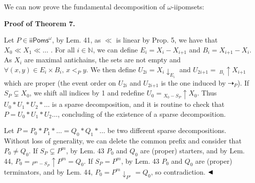  
 
We can now prove the fundamental decomposition of $\omega$-iipomsets:\par
 
 
 
 
\par\medskip\noindent\textbf{Proof of Theorem 7.}\par
 
 
Let $P\in{\mathsf{iiPoms}^{\omega}}$, by Lem. 41, as $\ll$ is linear by Prop. 5, we have that $X_{0}\ll X_{1}\ll\dots$ . For all $i\in\mathbb{N}$, we can define $E_{i}=X_{i}-X_{i\text{+}1}$ and $B_{i}=X_{i\text{+}1}-X_{i}$. As $X_{i}$ are maximal antichains, the sets are not empty and $\forall(x,y)\in E_{i}\times B_{i},\,x<_{P}y$. We then define $U_{2i}={X_{i}}{\downarrow}_{E_{i}}$ and $U_{2i\text{+}1}=\ {}_{B_{i}\!}{\uparrow}{X_{i\text{+}1}}$ which are proper (the event order on $U_{2i}$ and $U_{2i\text{+}1}$ is the one induced by $\dashrightarrow_{P}$). If $S_{P}\subsetneq X_{0}$, we shift all indices by 1 and redefine $U_{0}={}_{X_{0}-S_{P}\!}{\uparrow}{X_{0}}$. Thus $U_{0}*U_{1}*U_{2}*\dots$ is a sparse decomposition, and it is routine to check that $P=U_{0}*U_{1}*U_{2}\dots$, concluding of the existence of a sparse decomposition.\par
 
 
 
Let $P=P_{0}*P_{1}*\dots=Q_{0}*Q_{1}*\dots$ be two different sparse decompositions. Without loss of generality, we can delete the common prefix and consider that $P_{0}\neq Q_{0}$. If $S_{P}\subsetneq P^{m}$, by Lem. 43 $P_{0}$ and $Q_{0}$ are (proper) starters, and by Lem. 44, $P_{0}={}_{P^{m}-S_{P}\!}{\uparrow}{P^{m}}=Q_{0}$. If $S_{P}=P^{m}$, by Lem. 43 $P_{0}$ and $Q_{0}$ are (proper) terminators, and by Lem. 44, $P_{0}={P^{m}}{\downarrow}_{P^{s}}=Q_{0}$, so contradiction. $\hfill\blacktriangleleft$\par
 
 
 
 
